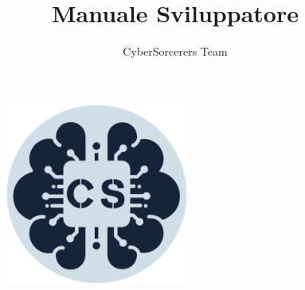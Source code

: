 \documentclass{article}
\title{\Huge{\textbf{Manuale Sviluppatore}}\vspace{-1em}}
\author{CyberSorcerers Team}
\date{}
\begin{document}
\maketitle
\vspace{-3em}
\begin{figure}[h]
  \centering
  \includegraphics[width=6cm, height=6cm]{documenti/logo rotondo.png}
  \label{fig:immagine}
\end{figure}
\end{document}
